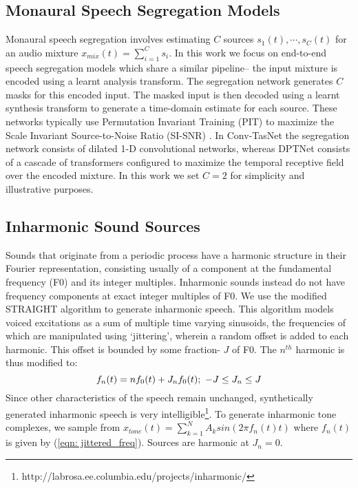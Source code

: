 \documentclass{article}
\begin{document}
\subsection{Monaural Speech Segregation Models}
\label{sec:Monaural Speech Separation Models}
Monaural speech segregation involves estimating $C$ sources $s_{1}(t), \cdots, s_{C}(t)$ for an audio mixture $x_{mix}(t) = \sum_{i=1}^{C}{s_{i}}$. In this work we focus on end-to-end speech segregation models \cite{luo2018tasnet} which share a similar pipeline-- the input mixture is encoded using a learnt analysis transform. The segregation network generates $C$ masks for this encoded input. The masked input is then decoded using a learnt synthesis transform to generate a time-domain estimate for each source. These networks typically use Permutation Invariant Training (PIT) \cite{kolbaek2017multitalker} to maximize the Scale Invariant Source-to-Noise Ratio (SI-SNR) \cite{luo2018tasnet}.
In Conv-TasNet the segregation network consists of dilated 1-D convolutional networks, whereas  DPTNet consists of a cascade of transformers configured to maximize the temporal receptive field over the encoded mixture. In this work we set $C=2$ for simplicity and illustrative purposes.

\subsection{Inharmonic Sound Sources}
\label{Inharmonic Sound Source}
Sounds that originate from a periodic process have a harmonic structure in their Fourier representation, consisting usually of a component at the fundamental frequency (F0) and its integer multiples.
Inharmonic sounds instead do not have frequency components at exact integer multiples of F0. We use the modified STRAIGHT algorithm \cite{ellis2012inharmonic} to generate inharmonic speech. This algorithm models voiced excitations as a sum of multiple time varying sinusoids, the frequencies of which are manipulated using `jittering', wherein a random offset is added to each harmonic. This offset is bounded by some fraction- $J$ of F0. The $n^{th}$ harmonic is thus modified to:
\vspace*{-2mm}
\begin{equation}
f_{n}(t) = n f_{0}(t) + J_{n} f_{0}(t) ;~ -J \le J_{n} \le J
\label{eqn: jittered_freq}
\vspace*{-2mm}
\end{equation}
Since other characteristics of the speech remain unchanged, synthetically generated inharmonic speech is very intelligible\footnote{http://labrosa.ee.columbia.edu/projects/inharmonic/}. 
To generate inharmonic tone complexes, we sample from $x_{tone}(t) = \sum_{k=1}^{N} A_{k} sin(2\pi f_{n}(t) t)$
where $f_{n}(t)$ is given by (\ref{eqn: jittered_freq}). Sources are harmonic at $J_{n}=0$.
\end{document}
